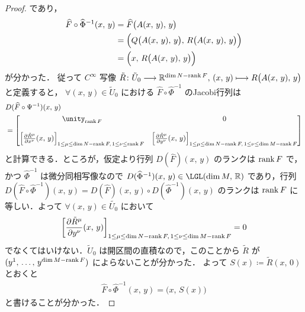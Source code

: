 \documentclass[geometry_main]{subfiles}
\begin{document}
\begin{proof}
    であり，
    \begin{align}
        \widehat{F} \circ \widehat{\Phi}^{-1} (x,\, y)
        &= \widehat{F} \bigl( A(x,\, y),\, y \bigr)  \\
        &= \Bigl( Q \bigl( A(x,\, y),\, y \bigr),\,  R \bigl( A(x,\, y),\, y \bigr)  \Bigr) \\
        &= \Bigl( x,\,  R \bigl( A(x,\, y),\, y \bigr)  \Bigr)
    \end{align}
    が分かった．
    従って $C^\infty$ 写像 $\tilde{R} \colon \tilde{U}_0 \longrightarrow \mathbb{R}^{\dim N -\rank F},\, (x,\, y) \longmapsto R \bigl( A(x,\, y),\, y \bigr)$ と定義すると，
    $\forall (x,\, y) \in \tilde{U}_0$ における $\widehat{F} \circ \widehat{\Phi}^{-1}$ のJacobi行列は
    \begin{align}
        &D (\widehat{F} \circ \Psi^{-1}) (x,\, y) \\
        &= 
        \mqty[
            \unity_{\rank F} & 0 \\
            & \\
            \left[\pdv{\tilde{R}^\mu}{x^\nu}()(x,\, y)\right]_{1 \le \mu \le \dim N - \rank F,\, 1 \le \nu \le \rank F} & \left[\pdv{\tilde{R}^\mu}{y^\nu}()(x,\, y)\right]_{1 \le \mu \le \dim N - \rank F,\, 1 \le \nu \le \dim M - \rank F} \\ 
        ]
    \end{align}
    と計算できる．ところが，仮定より行列 $D(\widehat{F})(x,\, y)$ のランクは $\rank F$ で，かつ $\widehat{\Phi}^{-1}$ は微分同相写像なので $D(\widehat{\Phi}^{-1})(x,\, y) \in \LGL(\dim M,\, \mathbb{R})$ であり，行列 $D (\widehat{F} \circ \widehat{\Phi}^{-1})(x,\, y) = D(\widehat{F})(x,\, y) \circ D(\widehat{\Phi}^{-1})(x,\, y)$ のランクは $\rank F$ に等しい．よって $\forall (x,\, y) \in \tilde{U_0}$ において
    \begin{align}
        \left[\pdv{\tilde{R}^\mu}{y^\nu}()(x,\, y)\right]_{1 \le \mu \le \dim N - \rank F,\, 1 \le \nu \le \dim M - \rank F} = 0
    \end{align}
    でなくてはいけない．$\tilde{U}_0$ は開区間の直積なので，このことから $\tilde{R}$ が $(y^1,\, \dots,\, y^{\dim M - \rank F})$ によらないことが分かった．
    よって $S(x) \coloneqq \tilde{R}(x,\, 0)$ とおくと
    \begin{align}
        \label{eq:thm-rank-1}
        \widehat{F} \circ \widehat{\Phi}^{-1}(x,\, y) = \bigl( x,\, S(x) \bigr) 
    \end{align}
    と書けることが分かった．


\end{proof}
\end{document}
